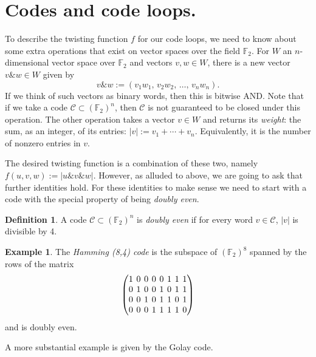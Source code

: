 \documentclass{article}
\theoremstyle{plain}
\theoremstyle{definition}
\newtheorem*{definition}{Definition}
\newtheorem{example}{Example}
\def \cC {\mathcal{C}}
\def \FF {\mathbb{F}}
\newcommand{\AND}{\mathbin{\texttt{\&}}}
\begin{document}
\section{Codes and code loops.}

To describe the twisting function $f$ for our code loops, we need to know about some extra operations that exist on vector spaces over the field $\FF_2$. 
For $W$ an $n$-dimensional vector space over $\FF_2$ and vectors $v,w\in W$, there is a new vector $v\AND w \in W$ given by
\[
	v\AND w := (v_1w_1,\,v_2w_2,\,\ldots,\,v_nw_n).
\]
If we think of such vectors as binary words, then this is bitwise AND. 
Note that if we take a code $\cC \subset (\FF_2)^n$, then $\cC$ is not guaranteed to be closed under this operation.
The other operation takes a vector $v\in W$ and returns its \emph{weight}: the sum, as an integer, of its entries: $|v| := v_1 + \cdots + v_n$. 
Equivalently, it is the number of nonzero entries in $v$.

The desired twisting function is a combination of these two, namely $f(u,v,w) := |u\AND v\AND w|$.
However, as alluded to above, we are going to ask that further identities hold. 
For these identities to make sense we need to start with a code with the special property of being \emph{doubly even}.

\begin{definition}
A code $\cC \subset (\FF_2)^n$ is \emph{doubly even} if for every word $v\in \cC$, $|v|$ is divisible by 4. 
\end{definition}


\begin{example}\label{example:Hamming}
The \emph{Hamming (8,4) code} is the subspace of $(\FF_2)^8$ spanned by the rows of the matrix
\[
\begingroup %
\setlength\arraycolsep{2pt}
\begin{pmatrix}
1&0&0&0&0&1&1&1\\
0&1&0&0&1&0&1&1\\
0&0&1&0&1&1&0&1\\
0&0&0&1&1&1&1&0
\end{pmatrix}
\endgroup
\]
and is doubly even.
\end{example}

A more substantial example is given by the Golay code.
\end{document}
